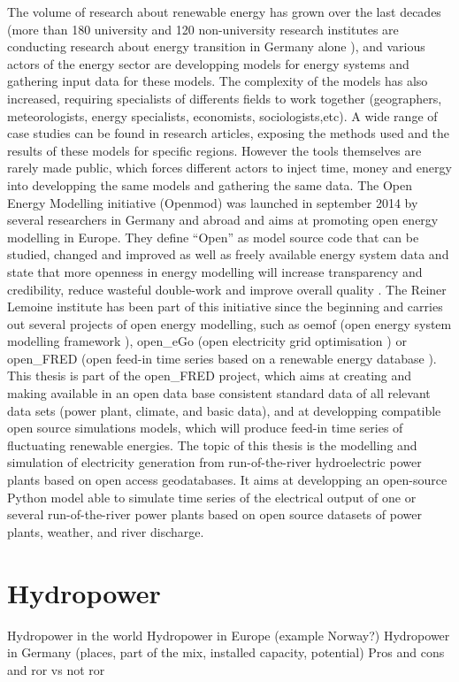 The volume of research about renewable energy has grown over the last decades (more than 180 university and 120 non-university research institutes are conducting research about energy transition in Germany alone \cite{bmbf_energiewende}), and various actors of the energy sector are developping models for energy systems and gathering input data for these models. The complexity of the models has also increased, requiring specialists of differents fields to work together (geographers, meteorologists, energy specialists, economists, sociologists,etc). A wide range of case studies can be found in research articles, exposing the methods used and the results of these models for specific regions. However the tools themselves are rarely made public, which forces different actors to inject time, money and energy into developping the same models and gathering the same data. \newline
The Open Energy Modelling initiative (Openmod) was launched in september 2014 by several researchers in Germany and abroad \cite{openmod_workshop} and aims at promoting open energy modelling in Europe. They define “Open” as model source code that can be studied, changed and improved as well as freely available energy system data and state that more openness in energy modelling will increase transparency and credibility, reduce wasteful double-work and improve overall quality \cite{openmod_manifesto}. \newline
The Reiner Lemoine institute has been part of this initiative since the beginning and  carries out several projects of open energy modelling, such as oemof (open energy system modelling framework \cite{rli_oemof}), open\_eGo (open electricity grid optimisation \cite{rli_openego}) or open\_FRED (open feed-in time series based on a renewable energy database \cite{rli_openfred}). This thesis is part of the open\_FRED project, which aims at creating and making available in an open data base consistent standard data of all relevant data sets (power plant, climate, and basic data), and at developping compatible open source simulations models, which will produce feed-in time series of fluctuating renewable energies. \newline
The topic of this thesis is the modelling and simulation of electricity generation from run-of-the-river hydroelectric power plants based on open access geodatabases. It aims at developping an open-source Python model able to simulate time series of the electrical output of one or several run-of-the-river power plants based on open source datasets of power plants, weather, and river discharge.


\section{Hydropower}
Hydropower in the world \newline
Hydropower in Europe (example Norway?) \newline
Hydropower in Germany (places, part of the mix, installed capacity, potential) \newline
Pros and cons and ror vs not ror 



